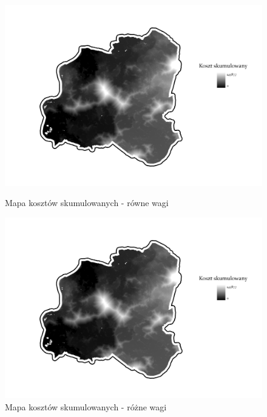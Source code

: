\documentclass{article}
\begin{document}
\begin{figure}[H]
    \begin{minipage}[t]{0.48\textwidth}
        \centering
        \includegraphics[width=\linewidth]{img/plesna-cost-distance.jpg}
        \caption{Mapa kosztów skumulowanych - równe wagi}
        \label{fig:cost-distance-rowne}
    \end{minipage}
    \hfill
    \begin{minipage}[t]{0.48\textwidth}
        \centering
        \includegraphics[width=\linewidth]{img/plesna-cost-distance.jpg}
        \caption{Mapa kosztów skumulowanych - różne wagi}
        \label{fig:cost-distance-rozne}
    \end{minipage}
\end{figure}
\end{document}
